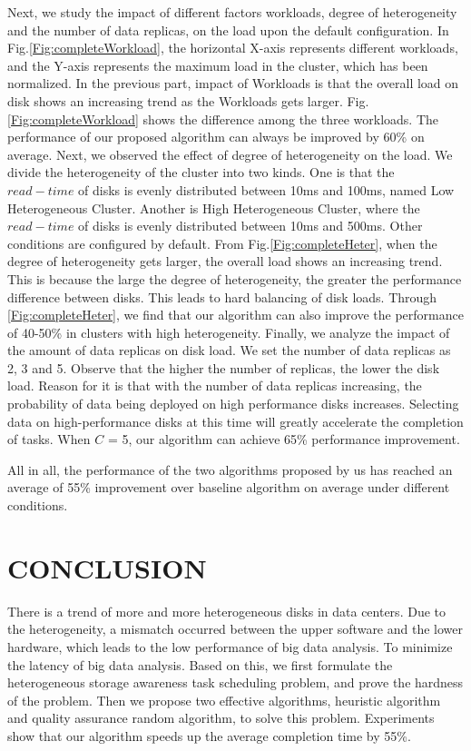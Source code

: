 \documentclass[conference]{IEEEtran}
\begin{document}
Next, we study the impact of different factors workloads, degree of heterogeneity and the number of data replicas, on the load upon the default configuration. In Fig.\ref{Fig:completeWorkload}, the horizontal X-axis represents different workloads, and the Y-axis represents the maximum load in the cluster, which has been normalized. In the previous part, impact of Workloads is that the overall load on disk shows an increasing trend as the Workloads gets larger. Fig.\ref{Fig:completeWorkload} shows the difference among the three workloads. The performance of our proposed algorithm can always be improved by 60\% on average. Next, we observed the effect of degree of heterogeneity on the load. We divide the heterogeneity of the cluster into two kinds. One is that the $read-time$ of disks is evenly distributed between 10ms and 100ms, named Low Heterogeneous Cluster. Another is High Heterogeneous Cluster, where the $read-time$ of disks is evenly distributed between 10ms and 500ms. Other conditions are configured by default. From Fig.\ref{Fig:completeHeter}, when the degree of heterogeneity gets larger, the overall load shows an increasing trend. This is because the large the degree of heterogeneity, the greater the performance difference between disks. This leads to hard balancing of disk loads. Through \ref{Fig:completeHeter}, we find that our algorithm can also improve the performance of 40-50\% in clusters with high heterogeneity. Finally, we analyze the impact of the amount of data replicas on disk load. We set the number of data replicas as 2, 3 and 5. Observe that the higher the number of replicas, the lower the disk load. Reason for it is that with the number of data replicas increasing, the probability of data being deployed on high performance disks increases. Selecting data on high-performance disks at this time will greatly accelerate the completion of tasks. When $C$ = 5, our algorithm can achieve 65\% performance improvement.
 
 All in all,  the performance of the two algorithms proposed by us has reached an average of 55\% improvement over baseline algorithm on average under different conditions.



\section{CONCLUSION}\label{CONCLUSION}
There is a trend of more and more heterogeneous disks in data centers. Due to the heterogeneity, a mismatch occurred between the upper software  and the lower hardware, which leads to the low performance of big data analysis. To minimize the latency of big data analysis. Based on this, we first formulate the heterogeneous storage awareness task scheduling problem, and prove the hardness of the problem. Then we propose two effective algorithms, heuristic algorithm and quality assurance random algorithm, to solve this problem. Experiments show that our algorithm speeds up the average completion time by 55\%. 
\end{document}
